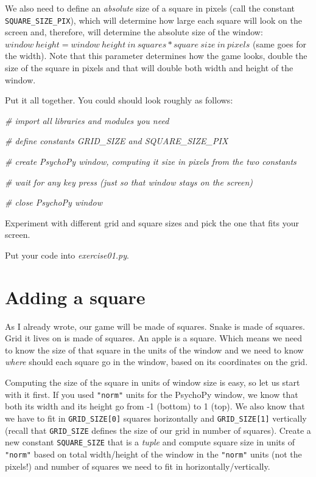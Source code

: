\documentclass[
]{book}
\newenvironment{Shaded}{\begin{snugshade}}{\end{snugshade}}
\newcommand{\CommentTok}[1]{\textcolor[rgb]{0.56,0.35,0.01}{\textit{#1}}}
\begin{document}
We also need to define an \emph{absolute} size of a square in pixels (call the constant \texttt{SQUARE\_SIZE\_PIX}), which will determine how large each square will look on the screen and, therefore, will determine the absolute size of the window: \(window~height = window~height~in~squares * square~size~in~pixels\) (same goes for the width). Note that this parameter determines how the game looks, double the size of the square in pixels and that will double both width and height of the window.

Put it all together. You could should look roughly as follows:

\begin{Shaded}
\begin{Highlighting}[]
\CommentTok{\# import all libraries and modules you need}

\CommentTok{\# define constants GRID\_SIZE and SQUARE\_SIZE\_PIX}

\CommentTok{\# create PsychoPy window, computing it size in pixels from the two constants}

\CommentTok{\# wait for any key press (just so that window stays on the screen)}

\CommentTok{\# close PsychoPy window}
\end{Highlighting}
\end{Shaded}

Experiment with different grid and square sizes and pick the one that fits your screen.

Put your code into \emph{exercise01.py}.

\hypertarget{adding-a-square}{%
\section{Adding a square}\label{adding-a-square}}

As I already wrote, our game will be made of squares. Snake is made of squares. Grid it lives on is made of squares. An apple is a square. Which means we need to know the size of that square in the units of the window and we need to know \emph{where} should each square go in the window, based on its coordinates on the grid.

Computing the size of the square in units of window size is easy, so let us start with it first. If you used \texttt{"norm"} units for the PsychoPy window, we know that both its width and its height go from -1 (bottom) to 1 (top). We also know that we have to fit in \texttt{GRID\_SIZE{[}0{]}} squares horizontally and \texttt{GRID\_SIZE{[}1{]}} vertically (recall that \texttt{GRID\_SIZE} defines the size of our grid in number of squares). Create a new constant \texttt{SQUARE\_SIZE} that is a \emph{tuple} and compute square size in units of \texttt{"norm"} based on total width/height of the window in the \texttt{"norm"} units (not the pixels!) and number of squares we need to fit in horizontally/vertically.
\end{document}
